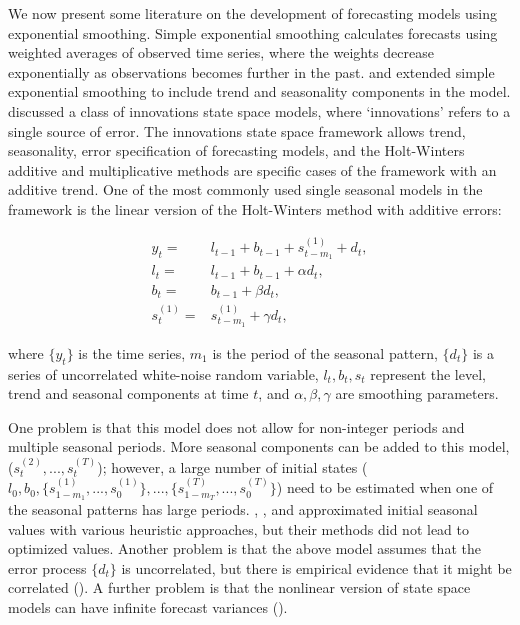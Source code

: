 \documentclass{uwstat572}
\begin{document}
We now present some literature on the development of forecasting models using exponential smoothing. Simple exponential smoothing calculates forecasts using weighted averages of observed time series, where the weights decrease exponentially as observations becomes further in the past. \citet{holt1957forecasting} and \citet{winters1960forecasting} extended simple exponential smoothing to include trend and seasonality components in the model. \citet{hyndman2002state} discussed a class of innovations state space models, where `innovations' refers to a single source of error. The innovations state space framework allows trend, seasonality, error specification of forecasting models, and the Holt-Winters additive and multiplicative methods are specific cases of the framework with an additive trend. One of the most commonly used single seasonal models in the framework is the linear version of the Holt-Winters method with additive errors:

\begin{subequations}
\begin{align}
 y_t=&l_{t-1}+b_{t-1}+s_{t-m_1}^{(1)}+d_t, \label{eqn:measurement.simple}\\
 l_t=&l_{t-1}+b_{t-1}+\alpha d_t,\label{eqn:level.simple} \\
 b_t=&b_{t-1}+\beta d_t,\label{eqn:trend.simple} \\
 s_t^{(1)}=&s_{t-m_1}^{(1)}+\gamma d_t,\label{eqn:error.simple}
\end{align}
\label{eqn:simple}
\end{subequations}

\noindent where $\{y_t\}$ is the time series, $m_1$ is the period of the seasonal pattern, $\{d_t\}$ is a series of uncorrelated white-noise random variable, $l_t, b_t, s_t$ represent the level, trend and seasonal components at time $t$, and $\alpha,\beta,\gamma$ are smoothing parameters.

One problem is that this model does not allow for non-integer periods and multiple seasonal periods. More seasonal components can be added to this model, ($s_t^{(2)},...,s_t^{(T)}$); however, a large number of initial states ($l_0, b_0, \{ s^{(1)}_{1-m_1}, ..., s_0^{(1)} \},...,  \{ s^{(T)}_{1-m_T}, ..., s_0^{(T)} \}$) need to be estimated when one of the seasonal patterns has large periods. \citet{taylor2003short}, \citet{taylor2010triple}, and \citet{gould2008forecasting} approximated initial seasonal values with various heuristic approaches, but their methods did not lead to optimized values. Another problem is that the above model assumes that the error process $\{d_t\}$ is uncorrelated, but there is empirical evidence that it might be correlated (\citet{taylor2003short}). A further problem is that the nonlinear version of state space models can have infinite forecast variances (\citet{akram2009exponential}). 
\end{document}
